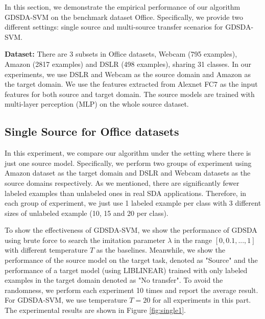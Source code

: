 In this section, we demonstrate the empirical performance of our algorithm GDSDA-SVM on the benchmark dataset Office. Specifically, we provide two different settings: single source and multi-source transfer scenarios for GDSDA-SVM.

\textbf{Dataset:}
There are 3 subsets in Office datasets, Webcam (795 examples), Amazon (2817 examples) and DSLR (498 examples), sharing 31 classes. In our experiments, we use DSLR and Webcam as the source domain and Amazon as the target domain.
We use the features extracted from Alexnet \cite{KrizhevskyNIPS12} FC7 as the input features for both source and target domain. The source models are trained with multi-layer perception (MLP) on the whole source dataset. 

\subsection{Single Source for Office datasets}
In this experiment, we compare our algorithm under the setting where there is just one source model. Specifically, we perform two groups of experiment using Amazon dataset as the target domain and DSLR and Webcam datasets as the source domains respectively. As we mentioned, there are significantly fewer labeled examples than unlabeled ones in real SDA applications.
Therefore, in each group of experiment, we just use 1 labeled example per class with 3 different sizes of unlabeled example (10, 15 and 20 per class).

To show the effectiveness of GDSDA-SVM, we show the performance of GDSDA using brute force to search the imitation parameter $\lambda$ in the range $[0,0.1,...,1]$ with different temperature $T$ as the baselines. Meanwhile, we show the performance of the source model on the target task, denoted as "Source" and the performance of a target model (using LIBLINEAR\cite{fan2008liblinear}) trained with only labeled examples in the target domain denoted as "No transfer". To avoid the randomness, we perform each experiment 10 times and report the average result. For GDSDA-SVM, we use temperature $T=20$ for all experiments in this part. The experimental results are shown in Figure \ref{fig:single1}. 

